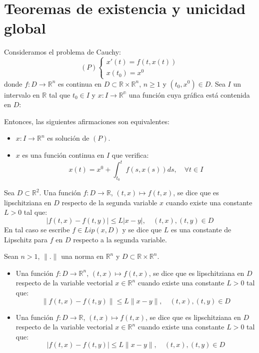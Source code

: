 \chapter{Teoremas de existencia y unicidad global}
\begin{theorem}
    Consideramos el problema de Cauchy:
    $$(P) \begin{cases}
            x'(t) = f(t, x(t)) \\
            x(t_0) = x^0
        \end{cases}$$
    donde $f: D \to \mathbb{R}^n$ es continua en $D \subset \mathbb{R} \times \mathbb{R}^n$, $n \geq 1$ y $(t_0, x^0) \in D$.
    Sea $I$ un intervalo en $\mathbb{R}$ tal que $t_0 \in I$ y $x: I \to \mathbb{R^n}$ una función cuya gráfica está contenida en $D$:

    Entonces, las siguientes afirmaciones son equivalentes:
    \begin{itemize}
        \item $x: I \to \mathbb{R}^n$ es solución de $(P)$.
        \item $x$ es una función continua en $I$ que verifica:
              $$x(t) = x^0 + \int_{t_0}^t f(s, x(s))ds, \quad \forall t \in I$$
    \end{itemize}
\end{theorem}

\begin{definition}
    Sea $D \subset \mathbb{R}^2$.
    Una función $f: D \to \mathbb{R}$, $(t, x) \mapsto f(t, x)$, se dice que es lipschitziana en $D$ respecto de la segunda variable $x$ cuando existe una constante $L > 0$ tal que:
    $$|f(t, x) - f(t, y)| \leq L|x-y|, \quad (t, x), (t, y) \in D$$
    En tal caso se escribe $f \in Lip(x, D)$ y se dice que $L$ es una constante de Lipschitz para $f$ en $D$ respecto a la segunda variable.
\end{definition}

\begin{definition}
    Sean $n > 1$, $\|.\|$ una norma en $\mathbb{R}^n$ y $D \subset \mathbb{R} \times \mathbb{R}^n$.
    \begin{itemize}
        \item Una función $f: D \to \mathbb{R}^n$, $(t, x) \mapsto f(t, x)$, se dice que es lipschitziana en $D$ respecto de la variable vectorial $x \in \mathbb{R}^n$ cuando existe una constante $L > 0$ tal que:
              $$\|f(t, x) - f(t, y)\| \leq L\|x-y\|, \quad (t, x), (t, y) \in D$$
        \item Una función $f: D \to \mathbb{R}$, $(t, x) \mapsto f(t, x)$, se dice que es lipschitziana en $D$ respecto de la variable vectorial $x \in \mathbb{R}^n$ cuando existe una constante $L > 0$ tal que:
              $$|f(t, x) - f(t, y)| \leq L\|x-y\|, \quad (t, x), (t, y) \in D$$
    \end{itemize}
\end{definition}

